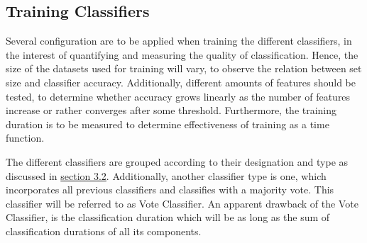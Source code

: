 			
	\subsection{Training Classifiers}
		Several configuration are to be applied when training the different classifiers, in the interest of quantifying and measuring the quality of classification. Hence, the size of the datasets used for training will vary, to observe the relation between set size and classifier accuracy. Additionally, different amounts of features should be tested, to determine whether accuracy grows linearly as the number of features increase or rather converges after some threshold. Furthermore, the training duration is to be measured to determine effectiveness of training as a time function.
		
		\par
		
		The different classifiers are grouped according to their designation and type as discussed in \hyperref[classifer_types]{section 3.2}. Additionally, another classifier type is one, which incorporates all previous classifiers and classifies with a majority vote. This classifier will be referred to as Vote Classifier. An apparent drawback of the Vote Classifier, is the classification duration which will be as long as the sum of classification durations of all its components.
		
		